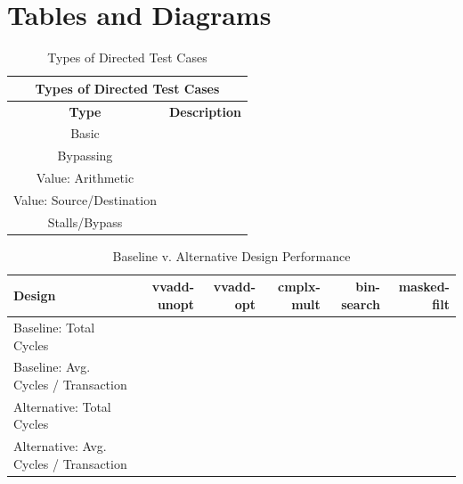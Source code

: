 \documentclass[10pt]{article}
\begin{document}
\pagebreak[4]

\section {Tables and Diagrams}


\begin{center}
\begin{table}[h]
\begin{tabular}{| c | c |}
\hline
\multicolumn{2}{|c|}{Types of Directed Test Cases}   \\
\hline
\textbf{Type}                         &    \textbf{Description}  	\\   \hline      
Basic            					  &           					\\
Bypassing                             &								\\
Value: Arithmetic           		  &          					\\        
Value: Source/Destination             & 							\\
Stalls/Bypass 						  & 							\\
\hline                                                 
\end{tabular}
\caption{Types of Directed Test Cases} 
\label{table:tests}
\end{table}
\end{center}


\begin{center}
\begin{table}[h]
\begin{tabular} {|l | r | r | r | r | r |}

\hline
\textbf{Design}    & \textbf{vvadd-unopt} & \textbf{vvadd-opt} & \textbf{cmplx-mult} & \textbf{bin-search} & \textbf{masked-filt} \\
\hline
Baseline:    Total Cycles                 &        &       &      & 	&						\\
Baseline:    Avg. Cycles / Transaction    &        &       &      & 	&						\\
Alternative: Total Cycles                 &        &       &      & 	&						\\
Alternative: Avg. Cycles / Transaction    &        &       &      & 	&					    \\
\hline                    
\end{tabular}
\caption{Baseline v. Alternative Design Performance}
\label{tab:cycles}
\end{table}
\end{center}
\end{document}
